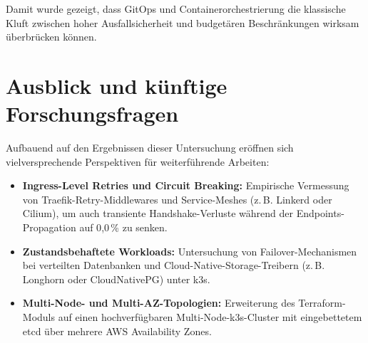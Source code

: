 Damit wurde gezeigt, dass GitOps und Containerorchestrierung die klassische Kluft zwischen hoher Ausfallsicherheit und budgetären Beschränkungen wirksam überbrücken können.

\section{Ausblick und künftige Forschungsfragen}
\label{sec:ausblick}
Aufbauend auf den Ergebnissen dieser Untersuchung eröffnen sich vielversprechende Perspektiven für weiterführende Arbeiten:
\begin{itemize}[noitemsep,topsep=2pt]
    \item \textbf{Ingress-Level Retries und Circuit Breaking:} Empirische Vermessung von Traefik-Retry-Middlewares und Service-Meshes (z.\,B. Linkerd oder Cilium), um auch transiente Handshake-Verluste während der Endpoints-Propagation auf 0{,}0\,\% zu senken.
    \item \textbf{Zustandsbehaftete Workloads:} Untersuchung von Failover-Mechanismen bei verteilten Datenbanken und Cloud-Native-Storage-Treibern (z.\,B. Longhorn oder CloudNativePG) unter k3s.
    \item \textbf{Multi-Node- und Multi-AZ-Topologien:} Erweiterung des Terraform-Moduls auf einen hochverfügbaren Multi-Node-k3s-Cluster mit eingebettetem etcd über mehrere AWS Availability Zones.
\end{itemize}
